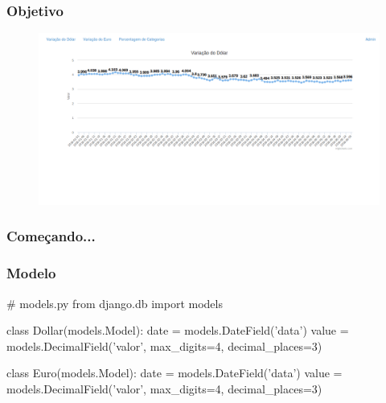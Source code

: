 \documentclass[aspectratio=169]{beamer}
\begin{document}
{\begin{frame}
\end{frame}

\begin{frame}\frametitle{Objetivo}

    \begin{figure}[h]
      \centering
        \includegraphics[width=.9\paperwidth]{img/dollar.png}
    \end{figure}

\end{frame}

\begin{frame}[fragile]\frametitle{Começando...}


\end{frame}

\begin{frame}[fragile]\frametitle{Modelo}

\begin{pythoncode}
# models.py
from django.db import models


class Dollar(models.Model):
    date = models.DateField('data')
    value = models.DecimalField('valor', max_digits=4,
                                decimal_places=3)


class Euro(models.Model):
    date = models.DateField('data')
    value = models.DecimalField('valor', max_digits=4,
                                decimal_places=3)
\end{pythoncode}

\end{frame}

\begin{frame}[fragile]\frametitle{}


\end{frame}}
\end{document}
